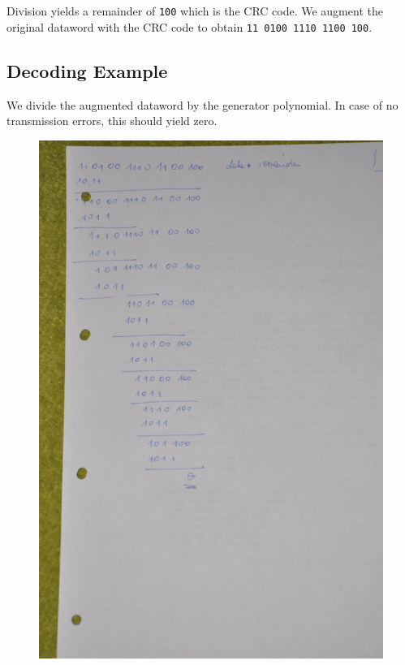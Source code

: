 Division yields a remainder of \texttt{100} which is the CRC code. We
augment the original dataword with the CRC code to obtain
\texttt{11\ 0100\ 1110\ 1100\ 100}.

\subsection{Decoding Example}\label{decoding-example}

We divide the augmented dataword by the generator polynomial. In case of
no transmission errors, this should yield zero.

\begin{figure}[H]
\centering
\includegraphics[scale=1.2]{images/DSC_0856_small.JPG}
\end{figure}

